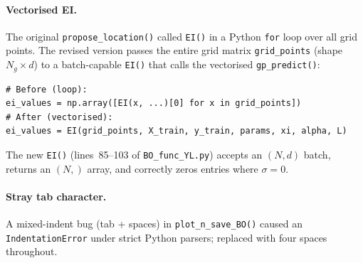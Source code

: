 \documentclass[11pt,a4paper]{article}
\theoremstyle{remark}
\newcommand{\codefile}[1]{\texttt{#1}}
\newcommand{\coderange}[2]{lines~#1--#2}
\newcommand{\codefn}[1]{\texttt{#1()}}
\begin{document}
\paragraph{Vectorised EI.}
The original \codefn{propose\_location} called \codefn{EI} in a Python
\texttt{for} loop over all grid points.  The revised version passes the entire
grid matrix \texttt{grid\_points} (shape $N_g \times d$) to a batch-capable
\codefn{EI} that calls the vectorised \codefn{gp\_predict}:
\begin{lstlisting}[numbers=none]
# Before (loop):
ei_values = np.array([EI(x, ...)[0] for x in grid_points])
# After (vectorised):
ei_values = EI(grid_points, X_train, y_train, params, xi, alpha, L)
\end{lstlisting}
The new \codefn{EI} (\coderange{85}{103} of \codefile{BO\_func\_YL.py})
accepts an $(N,d)$ batch, returns an $(N,)$ array, and correctly zeros
entries where $\sigma = 0$.

\paragraph{Stray tab character.}
A mixed-indent bug (tab + spaces) in \codefn{plot\_n\_save\_BO} caused an
\texttt{IndentationError} under strict Python parsers; replaced with four
spaces throughout.
\end{document}
